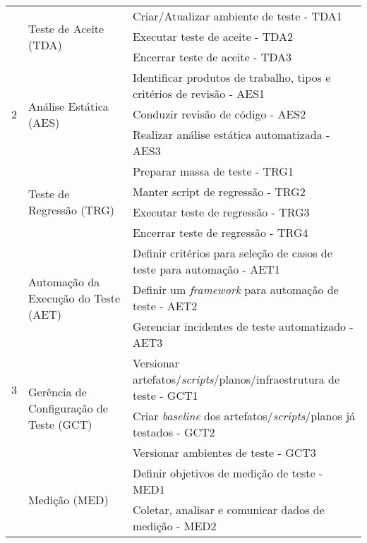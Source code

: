 \begin{table}[H]
{\begin{tabular}{|p{20mm}|p{76mm}|p{150mm}|}
    \hline
        \multirow{9}{*}{2}& 
        \multirow{3}{*}{Teste de Aceite (TDA)}& 
        Criar/Atualizar ambiente de teste - TDA1\\ 
    \cline{3-3}
        & & Executar teste de aceite - TDA2\\ 
    \cline{3-3}
        & & Encerrar teste de aceite - TDA3\\ 
    \cline{2-3}
        & \multirow{3}{*}{Análise Estática (AES)}& 
        Identificar produtos de trabalho, tipos e critérios de revisão - AES1\\ 
    \cline{3-3}
        & & Conduzir revisão de código - AES2\\ 
    \cline{3-3}
        & & Realizar análise estática automatizada - AES3\\
    \cline{2-3}
        & \multirow{4}{*}{Teste de Regressão (TRG)}& 
        Preparar massa de teste - TRG1\\ 
    \cline{3-3}
        & & Manter script de regressão - TRG2\\ 
    \cline{3-3}
        & & Executar teste de regressão - TRG3\\ 
    \cline{3-3}
        & & Encerrar teste de regressão - TRG4\\     
    \hline
        \multirow{10}{*}{3}&
       \multirow{3}{*}{Automação da Execução do Teste (AET)}
       & Definir critérios para seleção de casos de teste para automação - AET1\\ 
    \cline{3-3}
        & & Definir um \textit{framework} para automação de teste - AET2\\
    \cline{3-3}
        &  & Gerenciar incidentes de teste automatizado - AET3\\
    \cline{2-3}
        & \multirow{3}{*}{Gerência de Configuração de Teste (GCT)} & 
        Versionar artefatos/\textit{scripts}/planos/infraestrutura de teste - GCT1\\ 
    \cline{3-3}
        & & Criar \textit{baseline} dos artefatos/\textit{scripts}/planos já testados - GCT2\\
    \cline{3-3}
        & & Versionar ambientes de teste - GCT3\\ 
    \cline{2-3}
        & \multirow{3}{*}{Medição (MED)}& 
        Definir objetivos de medição de teste - MED1\\ 
    \cline{3-3}
        & & Coletar, analisar e comunicar dados de medição - MED2\\

\end{tabular}}
\end{table}
